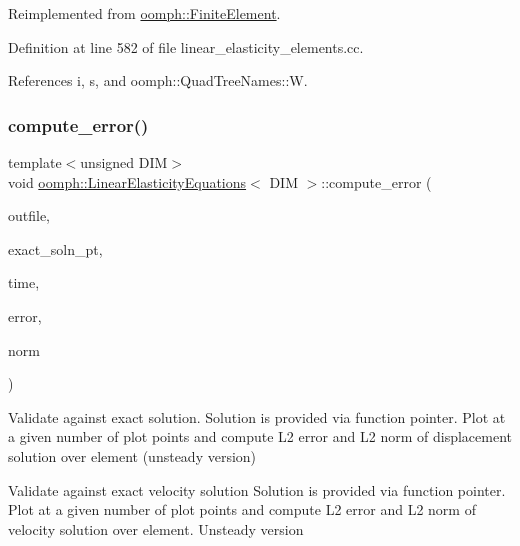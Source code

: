 Reimplemented from \hyperlink{classoomph_1_1FiniteElement_a73c79a1f1e5b1d334757812a6bbd58ff}{oomph\+::\+Finite\+Element}.



Definition at line 582 of file linear\+\_\+elasticity\+\_\+elements.\+cc.



References i, s, and oomph\+::\+Quad\+Tree\+Names\+::W.

\mbox{\label{classoomph_1_1LinearElasticityEquations_a8970a7a9633571974d8769717a3acc19}} 
\subsubsection{\texorpdfstring{compute\+\_\+error()}{compute\_error()}\hspace{0.1cm}{\footnotesize\ttfamily [2/2]}}
{\footnotesize\ttfamily template$<$unsigned D\+IM$>$ \\
void \hyperlink{classoomph_1_1LinearElasticityEquations}{oomph\+::\+Linear\+Elasticity\+Equations}$<$ D\+IM $>$\+::compute\+\_\+error (\begin{DoxyParamCaption}\item[{std\+::ostream \&}]{outfile,  }\item[{\hyperlink{classoomph_1_1FiniteElement_ad4ecf2b61b158a4b4d351a60d23c633e}{Finite\+Element\+::\+Unsteady\+Exact\+Solution\+Fct\+Pt}}]{exact\+\_\+soln\+\_\+pt,  }\item[{const double \&}]{time,  }\item[{double \&}]{error,  }\item[{double \&}]{norm }\end{DoxyParamCaption})\hspace{0.3cm}{\ttfamily [virtual]}}



Validate against exact solution. Solution is provided via function pointer. Plot at a given number of plot points and compute L2 error and L2 norm of displacement solution over element (unsteady version) 

Validate against exact velocity solution Solution is provided via function pointer. Plot at a given number of plot points and compute L2 error and L2 norm of velocity solution over element. Unsteady version 

